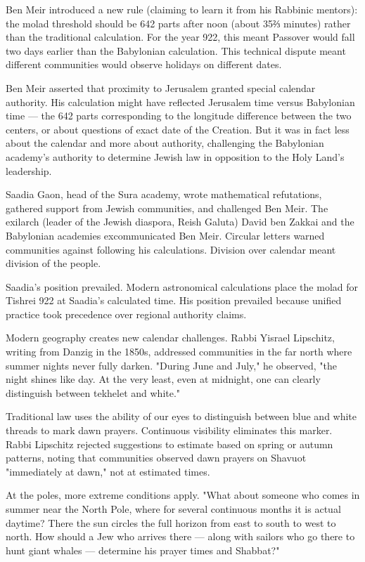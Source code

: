 Ben Meir introduced a new rule (claiming to learn it from his Rabbinic mentors): the molad threshold should be 642 parts after noon (about 35⅔ minutes) rather than the traditional calculation. For the year 922, this meant Passover would fall two days earlier than the Babylonian calculation. This technical dispute meant different communities would observe holidays on different dates.

Ben Meir asserted that proximity to Jerusalem granted special calendar authority. His calculation might have reflected Jerusalem time versus Babylonian time — the 642 parts corresponding to the longitude difference between the two centers, or about questions of exact date of the Creation. But it was in fact less about the calendar and more about authority, challenging the Babylonian academy's authority to determine Jewish law in opposition to the Holy Land's leadership.

Saadia Gaon, head of the Sura academy, wrote mathematical refutations, gathered support from Jewish communities, and challenged Ben Meir. The exilarch (leader of the Jewish diaspora, Reish Galuta) David ben Zakkai and the Babylonian academies excommunicated Ben Meir. Circular letters warned communities against following his calculations. Division over calendar meant division of the people.

Saadia's position prevailed. Modern astronomical calculations place the molad for Tishrei 922 at Saadia's calculated time. His position prevailed because unified practice took precedence over regional authority claims.

Modern geography creates new calendar challenges. Rabbi Yisrael Lipschitz, writing from Danzig in the 1850s, addressed communities in the far north where summer nights never fully darken. "During June and July," he observed, "the night shines like day. At the very least, even at midnight, one can clearly distinguish between tekhelet and white." 

Traditional law uses the ability of our eyes to distinguish between blue and white threads to mark dawn prayers. Continuous visibility eliminates this marker. Rabbi Lipschitz rejected suggestions to estimate based on spring or autumn patterns, noting that communities observed dawn prayers on Shavuot "immediately at dawn," not at estimated times.

At the poles, more extreme conditions apply. "What about someone who comes in summer near the North Pole, where for several continuous months it is actual daytime? There the sun circles the full horizon from east to south to west to north. How should a Jew who arrives there — along with sailors who go there to hunt giant whales — determine his prayer times and Shabbat?"

